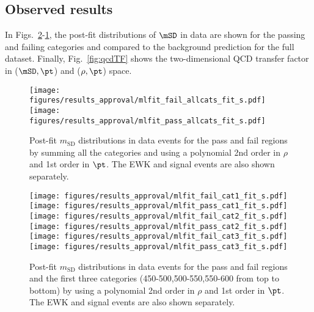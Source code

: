 \clearpage

\subsection{Observed results}

In Figs.~\ref{fig:fitdata0}-\ref{fig:fitdata2}, the post-fit distributions of $\mSD$ in data
are shown for the passing and failing categories and compared to the
background prediction for the full dataset. Finally,
Fig.~\ref{fig:qcdTF} shows the two-dimensional QCD transfer factor in
($\mSD,\pt$) and ($\rho,\pt$)  space.


\begin{figure}[hbtp]
\centering
    \texttt{[image: figures/results\_approval/mlfit\_fail\_allcats\_fit\_s.pdf]}
    \texttt{[image: figures/results\_approval/mlfit\_pass\_allcats\_fit\_s.pdf]}\\
 \caption{Post-fit $m_{\mathrm{SD}}$ distributions in data events for the
      pass and fail regions by summing all the \pt categories and using a
      polynomial 2nd order in $\rho$ and 1st order in $\pt$. The EWK and
      signal events are also shown separately.  }
 \label{fig:fitdata2}
 \end{figure}

\clearpage

\begin{figure}[hbtp]
\centering
    \texttt{[image: figures/results\_approval/mlfit\_fail\_cat1\_fit\_s.pdf]}
    \texttt{[image: figures/results\_approval/mlfit\_pass\_cat1\_fit\_s.pdf]}\\
    \texttt{[image: figures/results\_approval/mlfit\_fail\_cat2\_fit\_s.pdf]}
    \texttt{[image: figures/results\_approval/mlfit\_pass\_cat2\_fit\_s.pdf]}\\
    \texttt{[image: figures/results\_approval/mlfit\_fail\_cat3\_fit\_s.pdf]}
    \texttt{[image: figures/results\_approval/mlfit\_pass\_cat3\_fit\_s.pdf]}\\
 \caption{Post-fit $m_{\mathrm{SD}}$ distributions in data events for the
      pass and fail regions and the first three \pt categories (450-500,500-550,550-600 from top to bottom) by using a
      polynomial 2nd order in $\rho$ and 1st order in $\pt$. 
     The EWK and
      signal events are also shown separately.  }
 \label{fig:fitdata0}
 \end{figure}


